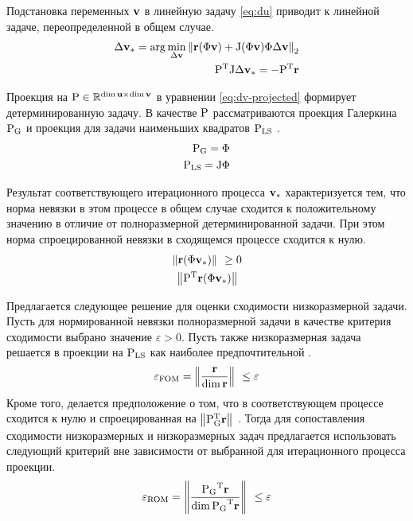 Подстановка переменных $\mathbf{v}$ в линейную задачу \ref{eq:du} приводит к линейной задаче, переопределенной в общем случае.
\begin{align}
    \dvunk_\ast = \arg \min_{\dvunk} \norm[2]{\resid(\Phi \vunk) + \jac(\Phi \vunk) \Phi \dvunk} \label{eq:dv}\\
    \transpose{P}\jac \dvunk_\ast = - \transpose{P} \resid \label{eq:dv-projected}
\end{align}

Проекция на $\matr{P} \in \mathbb{R}^{\dim \unk \times \dim \vunk}$ в уравнении \ref{eq:dv-projected} формирует детерминированную задачу.
В качестве $\matr{P}$ рассматриваются проекция Галеркина $\matr{P}_\text{G}$ и проекция для задачи наименьших квадратов $\matr{P}_\text{LS}$ \todo{\cite{}}.
\begin{align}
    \matr{P}_\text{G} = \Phi \\
    \matr{P}_\text{LS} = \jac \Phi \\
\end{align}

Результат соответствующего итерационного процесса $\mathbf{v}_\ast$ характеризуется тем, что норма невязки в этом процессе в общем случае сходится к положительному значению в отличие от полноразмерной детерминированной задачи. При этом норма спроецированной невязки в сходящемся процессе сходится к нулю.
\begin{align}
    \norm{\resid(\Phi \vunk_\ast)} \geq 0\\
    \norm{\transpose{P}\resid(\Phi \vunk_\ast)}
\end{align}

Предлагается следующее решение для оценки сходимости низкоразмерной задачи.
Пусть для нормированной невязки полноразмерной задачи в качестве критерия сходимости выбрано значение $\varepsilon > 0$. Пусть также низкоразмерная задача решается в проекции на $\matr{P}_{\text{LS}}$ как наиболее предпочтительной \todo{\cite{}}.
\begin{equation}
    \varepsilon_\text{FOM} = \left\| \frac{\mathbf{r}}{\dim{\mathbf{r}}} \right\|_{~} \leq \varepsilon \\
\end{equation}
Кроме того, делается предположение о том, что в соответствующем процессе сходится к нулю и спроецированная на $\norm{\transpose{P}_\text{G}\resid}$. Тогда для сопоставления сходимости низкоразмерных и низкоразмерных задач предлагается использовать следующий критерий вне зависимости от выбранной для итерационного процесса проекции.
\begin{equation}
    \varepsilon_\text{ROM} = \norm{\frac{\transpose{\matr{P}_\text{G}}\resid}{\dim{ \transpose{\matr{P}_\text{G}}\resid}}} \leq \varepsilon
\end{equation}

